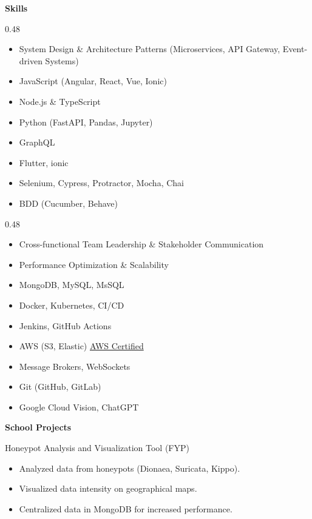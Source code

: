 \documentclass{res} %
\newcommand{\Section}[1]{%
  \vspace{8pt}%
  \begin{center}
    {\bfseries #1}
  \end{center}
  \vspace{2pt}%
}
\begin{document}
\begin{resume}
\begin{itemize}
  \end{itemize}
\Section{Skills}
\begin{varwidth}[t]{0.48\linewidth}
\begin{itemize}
  \item System Design \& Architecture Patterns (Microservices, API Gateway, Event-driven Systems)
  \item JavaScript (Angular, React, Vue, Ionic)
  \item Node.js \& TypeScript
  \item Python (FastAPI, Pandas, Jupyter)
  \item GraphQL
  \item Flutter, ionic
  \item Selenium, Cypress, Protractor, Mocha, Chai
  \item BDD (Cucumber, Behave)
\end{itemize}
\end{varwidth}
\hfill
\begin{varwidth}[t]{0.48\linewidth}
\begin{itemize}
  \item Cross-functional Team Leadership \& Stakeholder Communication
  \item Performance Optimization \& Scalability
  \item MongoDB, MySQL, MsSQL
  \item Docker, Kubernetes, CI/CD
  \item Jenkins, GitHub Actions
  \item AWS (S3, Elastic)   \hfill \href{https://cp.certmetrics.com/amazon/en/public/verify/credential/6P5QC70DEB141536}{AWS Certified}\\
  \item Message Brokers, WebSockets
  \item Git (GitHub, GitLab)
  \item Google Cloud Vision, ChatGPT
\end{itemize}
\end{varwidth}


\Section{School Projects}
  Honeypot Analysis and Visualization Tool (FYP) 
  \begin{itemize}\smallskip
    \item Analyzed data from honeypots (Dionaea, Suricata, Kippo).
    \item Visualized data intensity on geographical maps.
    \item Centralized data in MongoDB for increased performance.
  \end{itemize}


\end{resume}
\end{document}
